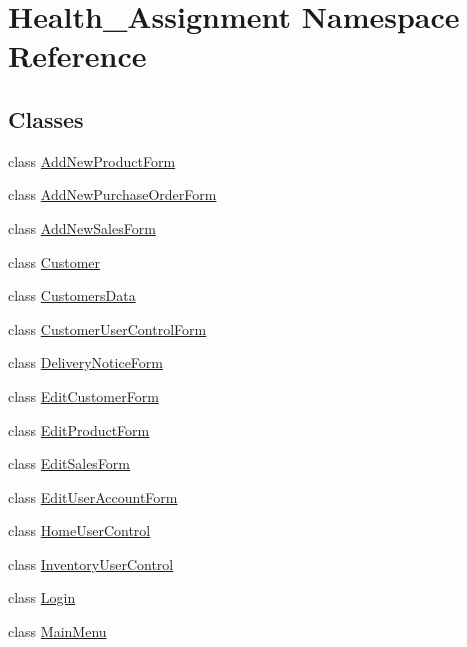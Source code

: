 \hypertarget{namespace_health___assignment}{}\section{Health\+\_\+\+Assignment Namespace Reference}
\label{namespace_health___assignment}
\subsection*{Classes}
\begin{DoxyCompactItemize}
\item 
class \hyperlink{class_health___assignment_1_1_add_new_product_form}{Add\+New\+Product\+Form}
\item 
class \hyperlink{class_health___assignment_1_1_add_new_purchase_order_form}{Add\+New\+Purchase\+Order\+Form}
\item 
class \hyperlink{class_health___assignment_1_1_add_new_sales_form}{Add\+New\+Sales\+Form}
\item 
class \hyperlink{class_health___assignment_1_1_customer}{Customer}
\item 
class \hyperlink{class_health___assignment_1_1_customers_data}{Customers\+Data}
\item 
class \hyperlink{class_health___assignment_1_1_customer_user_control_form}{Customer\+User\+Control\+Form}
\item 
class \hyperlink{class_health___assignment_1_1_delivery_notice_form}{Delivery\+Notice\+Form}
\item 
class \hyperlink{class_health___assignment_1_1_edit_customer_form}{Edit\+Customer\+Form}
\item 
class \hyperlink{class_health___assignment_1_1_edit_product_form}{Edit\+Product\+Form}
\item 
class \hyperlink{class_health___assignment_1_1_edit_sales_form}{Edit\+Sales\+Form}
\item 
class \hyperlink{class_health___assignment_1_1_edit_user_account_form}{Edit\+User\+Account\+Form}
\item 
class \hyperlink{class_health___assignment_1_1_home_user_control}{Home\+User\+Control}
\item 
class \hyperlink{class_health___assignment_1_1_inventory_user_control}{Inventory\+User\+Control}
\item 
class \hyperlink{class_health___assignment_1_1_login}{Login}
\item 
class \hyperlink{class_health___assignment_1_1_main_menu}{Main\+Menu}

\end{DoxyCompactItemize}
